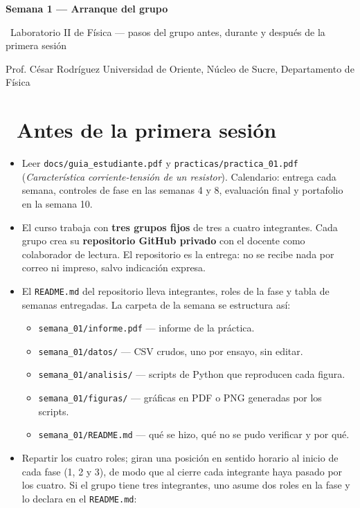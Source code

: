 \documentclass[11pt,a4paper]{article}
\newcommand{\iconoBanda}{microchip}
\newcommand{\bandaTitulo}[3][fondoOscuro]{%
  \begin{tcolorbox}[
    enhanced,
    colback=#1, colframe=#1,
    boxrule=0pt, arc=8pt, outer arc=8pt,
    width=\linewidth,
    top=18pt, bottom=6pt, left=14pt, right=14pt,
    borderline south={3.5pt}{0pt}{cyanNeon},
  ]
    \begin{minipage}[c]{0.07\linewidth}
      \centering
      \textcolor{cyanNeon}{\fontsize{30}{30}\selectfont\faIcon{\iconoBanda}}
    \end{minipage}%
    \hspace{8pt}%
    \begin{minipage}[c]{0.88\linewidth}
      {\fontsize{20}{24}\selectfont\bfseries\color{white}#2}\par\vspace{5pt}%
      \textcolor{cyanNeon!80!white}{\small\faIcon{angle-right}~#3}%
    \end{minipage}
    \vspace{4pt}
  \end{tcolorbox}%
  \vspace{8pt}%
}
\newcommand{\iconotexto}[2]{\textcolor{cyanNeon}{\faIcon{#1}}~#2}
\renewcommand{\iconoBanda}{atom}
\begin{document}
\bandaTitulo{Semana 1 --- Arranque del grupo}{Laboratorio II de Física --- pasos del grupo antes, durante y después de la primera sesión}

\begin{center}\small\color{grisTexto}Prof. César Rodríguez \textbar{} Universidad de Oriente, Núcleo de Sucre, Departamento de Física\end{center}

\section{\iconotexto{book}{Antes de la primera sesión}}

\begin{itemize}[leftmargin=1.4em,itemsep=2pt,topsep=3pt]
  \item Leer \texttt{docs/guia\_estudiante.pdf} y \texttt{practicas/practica\_01.pdf} (\emph{Característica corriente-tensión de un resistor}). Calendario: entrega cada semana, controles de fase en las semanas 4 y 8, evaluación final y portafolio en la semana 10.
  \item El curso trabaja con \textbf{tres grupos fijos} de tres a cuatro integrantes. Cada grupo crea su \textbf{repositorio GitHub privado} con el docente como colaborador de lectura. El repositorio es la entrega: no se recibe nada por correo ni impreso, salvo indicación expresa.
  \item El \texttt{README.md} del repositorio lleva integrantes, roles de la fase y tabla de semanas entregadas. La carpeta de la semana se estructura así:
  \begin{itemize}[leftmargin=1.2em,itemsep=1pt,topsep=2pt]
    \item \texttt{semana\_01/informe.pdf} --- informe de la práctica.
    \item \texttt{semana\_01/datos/} --- CSV crudos, uno por ensayo, sin editar.
    \item \texttt{semana\_01/analisis/} --- scripts de Python que reproducen cada figura.
    \item \texttt{semana\_01/figuras/} --- gráficas en PDF o PNG generadas por los scripts.
    \item \texttt{semana\_01/README.md} --- qué se hizo, qué no se pudo verificar y por qué.
  \end{itemize}
  \item Repartir los cuatro roles; giran una posición en sentido horario al inicio de cada fase (1, 2 y 3), de modo que al cierre cada integrante haya pasado por los cuatro. Si el grupo tiene tres integrantes, uno asume dos roles en la fase y lo declara en el \texttt{README.md}:

\end{itemize}
\end{document}
